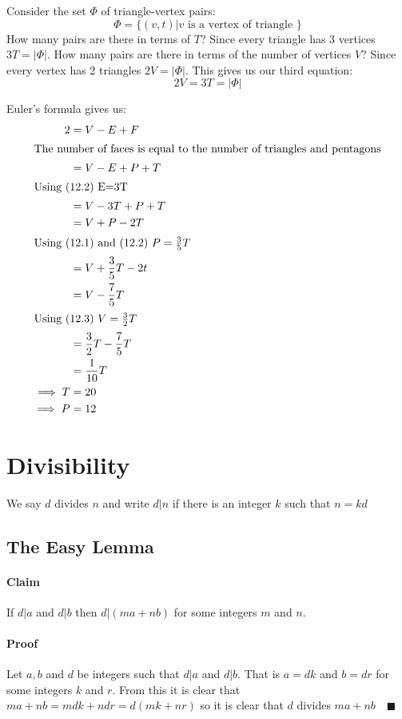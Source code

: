 \documentclass{article}
\begin{document}
Consider the set \(\Phi\) of triangle-vertex pairs:
\[\Phi=\{(v,t)|v\text{ is a vertex of triangle }\}\]
How many pairs are there in terms of \(T\)? Since every triangle has 3 vertices \(3T=|\Phi|\). How many pairs are there in terms of the number of vertices \(V\)? Since every vertex has 2 triangles \(2V=|\Phi|\). This gives us our third equation:
\[2V=3T=|\Phi|\tag{12.3}\]

Euler's formula gives us:
\begin{align*}
2&=V-E+F\\
\intertext{The number of faces is equal to the number of triangles and pentagons}
&=V-E+P+T\\
\intertext{Using (12.2) E=3T}
&=V-3T+P+T\\
&=V+P-2T\\
\intertext{Using (12.1) and (12.2) \(P=\frac35T\)}
&=V+\frac35T-2t\\
&=V-\frac75T\\
\intertext{Using (12.3) \(V=\frac32T\)}
&=\frac32T-\frac75T\\
&=\frac{1}{10}T\\
\implies T&=20\\
\implies P&=12
\end{align*}

\section{Divisibility}

We say \(d\) divides \(n\) and write \(d|n\) if there is an integer \(k\) such that \(n=kd\)
 
\subsection*{The Easy Lemma}

\paragraph{Claim} If \(d|a\) and \(d|b\) then \(d|(ma+nb)\) for some integers \(m\) and \(n\).

\paragraph{Proof} Let \(a,b\) and \(d\) be integers such that \(d|a\) and \(d|b\). That is \(a=dk\) and \(b=dr\) for some integers \(k\) and \(r\). From this it is clear that \(ma+nb=mdk+ndr=d(mk+nr)\) so it is clear that \(d\) divides \(ma+nb\quad\blacksquare\)
\end{document}
